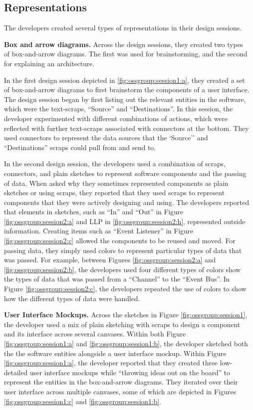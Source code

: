 \subsection{Representations}

The developers created several types of representations in their design sessions.

\textbf{Box and arrow diagrams. } Across the design sessions, they created two types of box-and-arrow diagrams. The first was used for brainstorming, and the second for explaining an architecture.

In the first design session depicted in \ref{fig:ossgroup:session1:a}, they created a set of box-and-arrow diagrams to first brainstorm the components of a user interface. The design session began by first listing out the relevant entities in the software, which were the text-scraps, ``Source'' and ``Destinations''. In this session, the developer experimented with different combinations of actions, which were reflected with further text-scraps associated with connectors at the bottom. They used connectors to represent the data sources that the `Source'' and ``Destinations'' scraps could pull from and send to.

In the second design session, the developers used a combination of scraps, connectors, and plain sketches to represent software components and the passing of data. When asked why they sometimes represented components as plain sketches or using scraps, they reported that they used scraps to represent components that they were actively designing and using. The developers reported that elements in sketches, such as ``In'' and ``Out'' in Figure \ref{fig:ossgroup:session2:a} and LLP in \ref{fig:ossgroup:session2:h}, represented outside information. Creating items such as ``Event Listener'' in Figure \ref{fig:ossgroup:session2:c} allowed the components to be reused and moved. For passing data, they simply used colors to represent particular types of data that was passed. For example, between Figures \ref{fig:ossgroup:session2:a} and \ref{fig:ossgroup:session2:b}, the developers used four different types of colors show the types of data that was passed from a ``Channel'' to the ``Event Bus''. In Figure \ref{fig:ossgroup:session2:c}, the developers repeated the use of colors to show how the different types of data were handled.

\textbf{User Interface Mockups. } Across the sketches in Figure \ref{fig:ossgroup:session1}, the developer used a mix of plain sketching with scraps to design a component and its interface across several canvases. Within both Figure \ref{fig:ossgroup:session1:a} and \ref{fig:ossgroup:session1:b}, the developer sketched both the the software entities alongside a user interface mockup. Within Figure \ref{fig:ossgroup:session1:a}, the developer reported that they created three low-detailed user interface mockups while ``throwing ideas out on the board'' to represent the entities in the box-and-arrow diagrams. They iterated over their user interface across multiple canvases, some of which are depicted in Figures \ref{fig:ossgroup:session1:c} and \ref{fig:ossgroup:session1:b}.

